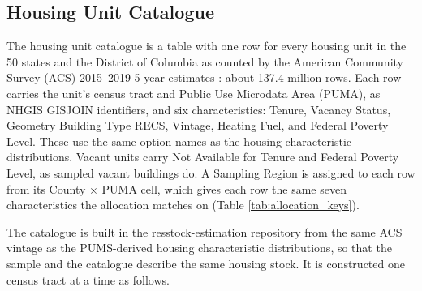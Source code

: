 \subsection{Housing Unit Catalogue}\label{sec:housing_unit_catalogue}
The housing unit catalogue is a table with one row for every housing unit in the 50 states and the District of Columbia as counted by the American Community Survey (ACS) 2015--2019 5-year estimates \citep{ACS2019}: about 137.4 million rows. Each row carries the unit's census tract and Public Use Microdata Area (PUMA), as NHGIS GISJOIN identifiers, and six characteristics: Tenure, Vacancy Status, Geometry Building Type RECS, Vintage, Heating Fuel, and Federal Poverty Level. These use the same option names as the housing characteristic distributions. Vacant units carry Not Available for Tenure and Federal Poverty Level, as sampled vacant buildings do. A Sampling Region is assigned to each row from its County $\times$ PUMA cell, which gives each row the same seven characteristics the allocation matches on (Table \ref{tab:allocation_keys}).

The catalogue is built in the resstock-estimation repository from the same ACS vintage as the PUMS-derived housing characteristic distributions, so that the sample and the catalogue describe the same housing stock. It is constructed one census tract at a time as follows.

